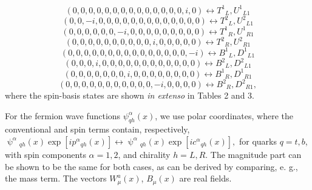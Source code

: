 \documentclass[12pt]{article}
\renewcommand\[{\begin{dmath}}
\renewcommand\]{\end{dmath}}
\begin{document}
 \[ (0, 0, 0, 0, 0, 0, 0, 0, 0, 0, 0, 0, 0, 0, i, 0) \leftrightarrow T  ^1{}_{ { L}},U  ^1{}_{ { L} 1}  \]
  \[ \nonumber (0, 0, -i, 0, 0, 0, 0, 0, 0, 0, 0, 0, 0, 0, 0, 0) \leftrightarrow T  ^2{}_{ { L}} , U  ^2{}_{ { L} 1}   \]
 \[  (0, 0, 0, 0, 0, 0, -i, 0, 0, 0, 0, 0, 0, 0, 0, 0) \leftrightarrow T  ^1{}_{ { R}} , U  ^1{}_{ { R} 1}  \]
  \[ \nonumber (0, 0, 0, 0, 0, 0, 0, 0, 0, 0, i, 0, 0, 0, 0, 0) \leftrightarrow T  ^2{}_{ { R}} ,U  ^2{}_{ { R} 1}  \]
  \[ \nonumber  ({0, 0, 0, 0, 0, 0, 0, 0, 0, 0, 0, 0, 0, 0, 0, -i}) \leftrightarrow B  ^1{}_{ { L}},D  ^1{}_{ { L} 1}  \]
 \[  (0, 0, 0, i, 0, 0, 0, 0, 0, 0, 0, 0, 0, 0, 0, 0) \leftrightarrow B  ^2{}_{ { L}}, D  ^2{}_{ { L} 1}  \]
  \[ \nonumber ({ 0, 0, 0, 0, 0, 0, 0, i, 0, 0, 0, 0, 0, 0, 0, 0}) \leftrightarrow B  ^1{}_{ { R}} , D  ^1{}_{ { R} 1}  \]
   \[  (0, 0, 0, 0, 0, 0, 0, 0, 0, 0, 0, -i, 0, 0, 0, 0) \leftrightarrow B  ^2{}_{ { R}} , D  ^2{}_{ { R} 1},   \]
where the spin-basis states are shown {\it in
extenso} in Tables 2 and 3.

 For the fermion wave functions $ \psi_{qh}^\alpha(x)  $, we use  polar coordinates, where the conventional and spin terms contain,
 respectively, $\uppsi^\alpha{}   _{qh}(x) \exp{[i p^\alpha{}_{qh}(x)]} \leftrightarrow
 \uppsi^\alpha{}_{qh}(x) \exp{[i c^\alpha{}_{qh}(x)]},$   for quarks  $q=t,b$,  with spin components  $\alpha=1,2$, and chirality   $h=L,R$.
  The magnitude part can be shown to be the same for both cases, as can be derived by comparing, e. g., the mass term. The vectors $W_\mu^a(x)$,
 $B_\mu(x)$  are real fields.
\end{document}
